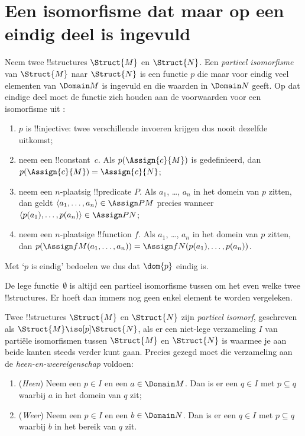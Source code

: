 \documentclass[openany]{memoir}
\begin{document}
\section{Een isomorfisme dat maar op een eindig deel is ingevuld}

\begin{defn}
  Neem twee !!{structure}s $\Struct{M}$ en $\Struct{N}$. Een
  \emph{partieel isomorfisme} van $\Struct{M}$ naar $\Struct{N}$ is
  een functie $p$ die maar voor eindig veel elementen van $\Domain M$
  is ingevuld en die waarden in $\Domain N$ geeft. Op dat eindige deel
  moet de functie zich houden aan de voorwaarden voor een isomorfisme uit
  :
  \begin{enumerate}
  \item $p$ is !!{injective}: twee verschillende invoeren krijgen dus
    nooit dezelfde uitkomst;
  \item neem een !!{constant}~$c$. Als $p(\Assign{c}{M})$ is
    gedefinieerd, dan $p(\Assign{c}{M}) = \Assign{c}{N}$;
  \item neem een $n$-plaatsig !!{predicate} $P$. Als $a_1$, \dots, $a_n$
    in het domein van $p$ zitten, dan geldt
    $\langle a_1, \dots, a_n\rangle \in \Assign P M$ precies wanneer
    $\langle p(a_1), \dots, p(a_n) \rangle \in \Assign P N$;
  \item neem een $n$-plaatsige !!{function} $f$. Als $a_1$, \dots, $a_n$
    in het domein van $p$ zitten, dan $p(\Assign f M (a_1, \dots,a_n))
    = \Assign f N (p(a_1), \dots, p(a_n))$.
  \end{enumerate}
  Met ‘$p$ is eindig’ bedoelen we dus dat $\dom{p}$ eindig is.
\end{defn}

De lege functie~$\emptyset$ is altijd een partieel isomorfisme tussen
om het even welke twee !!{structure}s. Er hoeft dan immers nog geen
enkel element te worden vergeleken.

\begin{defn}
  Twee !!{structure}s $\Struct{M}$ en $\Struct{N}$ zijn
  \emph{partieel isomorf}, geschreven als $\Struct{M} \iso[p]
  \Struct{N}$, als er een niet-lege verzameling $I$ van partiële
  isomorfismen tussen $\Struct{M}$ en $\Struct{N}$ is waarmee je aan
  beide kanten steeds verder kunt gaan. Precies gezegd moet die verzameling aan de
  \emph{heen-en-weereigenschap} voldoen:
  \begin{enumerate}
  \item (\emph{Heen}) Neem een $p \in I$ en een $a \in \Domain M$.
    Dan is er een $q \in I$ met $p \subseteq q$ waarbij $a$ in het
    domein van $q$ zit;
  \item (\emph{Weer}) Neem een $p \in I$ en een $b \in \Domain N$.
    Dan is er een $q \in I$ met $p \subseteq q$ waarbij $b$ in het
    bereik van $q$ zit.
  \end{enumerate}
\end{defn}
\end{document}
